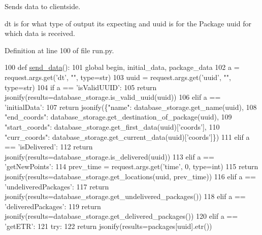 Sends data to clientside. 

dt is for what type of output it\textquotesingle{}s expecting and uuid is for the Package uuid for which data is received. 

Definition at line 100 of file run.\+py.


\begin{DoxyCode}
100 \textcolor{keyword}{def }\hyperlink{namespacerun_aeefb6baadf72429a8685237fc18b7756}{send\_data}():
101     \textcolor{keyword}{global} begin, initial\_data, package\_data
102     a = request.args.get(\textcolor{stringliteral}{'dt'}, \textcolor{stringliteral}{""}, type=str)
103     uuid = request.args.get(\textcolor{stringliteral}{'uuid'}, \textcolor{stringliteral}{""}, type=str)
104     \textcolor{keywordflow}{if} a == \textcolor{stringliteral}{'isValidUUID'}:
105         \textcolor{keywordflow}{return} jsonify(results=database\_storage.is\_valid\_uuid(uuid))
106     \textcolor{keywordflow}{elif} a == \textcolor{stringliteral}{'initialData'}:
107         \textcolor{keywordflow}{return} jsonify(\{\textcolor{stringliteral}{"name"}: database\_storage.get\_name(uuid),
108                         \textcolor{stringliteral}{"end\_coords"}: database\_storage.get\_destination\_of\_package(uuid),
109                         \textcolor{stringliteral}{"start\_coords"}: database\_storage.get\_first\_data(uuid)[\textcolor{stringliteral}{'coords'}],
110                         \textcolor{stringliteral}{"curr\_coords"}: database\_storage.get\_current\_data(uuid)[\textcolor{stringliteral}{'coords'}]\})
111     \textcolor{keywordflow}{elif} a == \textcolor{stringliteral}{'isDelivered'}:
112         \textcolor{keywordflow}{return} jsonify(results=database\_storage.is\_delivered(uuid))
113     \textcolor{keywordflow}{elif} a == \textcolor{stringliteral}{'getNewPoints'}:
114         prev\_time = request.args.get(\textcolor{stringliteral}{'time'}, 0, type=int)
115         \textcolor{keywordflow}{return} jsonify(results=database\_storage.get\_locations(uuid, prev\_time))
116     \textcolor{keywordflow}{elif} a == \textcolor{stringliteral}{'undeliveredPackages'}:
117         \textcolor{keywordflow}{return} jsonify(results=database\_storage.get\_undelivered\_packages())
118     \textcolor{keywordflow}{elif} a == \textcolor{stringliteral}{'deliveredPackages'}:
119         \textcolor{keywordflow}{return} jsonify(results=database\_storage.get\_delivered\_packages())
120     \textcolor{keywordflow}{elif} a == \textcolor{stringliteral}{'getETR'}:
121         \textcolor{keywordflow}{try}:
122             \textcolor{keywordflow}{return} jsonify(results=packages[uuid].etr())

\end{DoxyCode}
